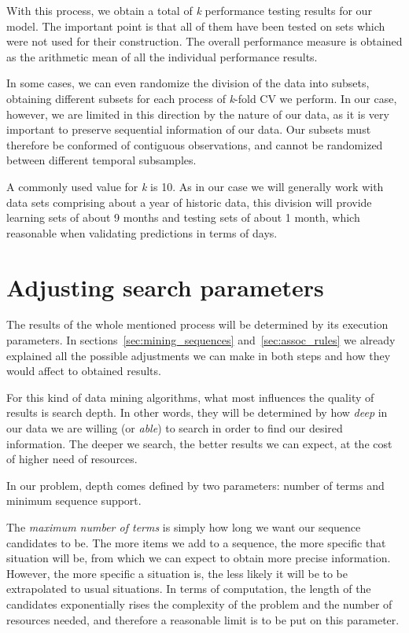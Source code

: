 \documentclass[a4paper,12pt]{article}
\begin{document}
With this process, we obtain a total of \textit{k} performance testing results for our model. The important point is that all of them have been tested on sets which were not used for their construction. The overall performance measure is obtained as the arithmetic mean of all the individual performance results.

In some cases, we can even randomize the division of the data into subsets, obtaining different subsets for each process of \textit{k}-fold CV we perform. In our case, however, we are limited in this direction by the nature of our data, as it is very important to preserve sequential information of our data. Our subsets must therefore be conformed of contiguous observations, and cannot be randomized between different temporal subsamples.

A commonly used value for \textit{k} is 10. As in our case we will generally work with data sets comprising about a year of historic data, this division will provide learning sets of about 9 months and testing sets of about 1 month, which reasonable when validating predictions in terms of days.

\section{Adjusting search parameters}
\label{sec:search_parameters}
The results of the whole mentioned process will be determined by its execution parameters. In sections~\ref{sec:mining_sequences} and~\ref{sec:assoc_rules} we already explained all the possible adjustments we can make in both steps and how they would affect to obtained results. 

For this kind of data mining algorithms, what most influences the quality of results is search depth. In other words, they will be determined by how \emph{deep} in our data we are willing (or \emph{able}) to search in order to find our desired information. The deeper we search, the better results we can expect, at the cost of higher need of resources.

In our problem, depth comes defined by two parameters: number of terms and minimum sequence support.

The \emph{maximum number of terms} is simply how long we want our sequence candidates to be. The more items we add to a sequence, the more specific that situation will be, from which we can expect to obtain more precise information. However, the more specific a situation is, the less likely it will be to be extrapolated to usual situations. In terms of computation, the length of the candidates exponentially rises the complexity of the problem and the number of resources needed, and therefore a reasonable limit is to be put on this parameter.
\end{document}
